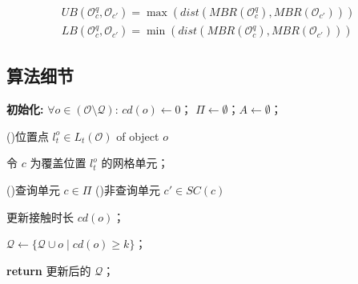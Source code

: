 \begin{equation}
    \label{contact_eq:pre-check}
        \begin{aligned}
        UB(\mathcal{O}_c^q, \mathcal{O}_{c'}) = \max (dist(\mathit{MBR}(\mathcal{O}_c^q), \mathit{MBR}(\mathcal{O}_{c'})))\\
        LB(\mathcal{O}_c^q, \mathcal{O}_{c'}) = \min (dist(\mathit{MBR}(\mathcal{O}_c^q), \mathit{MBR}(\mathcal{O}_{c'})))
        \end{aligned}
    \end{equation}



\subsection{算法细节}

\begin{algorithm}[!ht]
\caption{精确分组处理算法}
\label{contact_alg:EGP}


\textbf{初始化:}
$\forall o \in (\mathcal{O} \setminus \mathcal{Q})$: $cd(o) \leftarrow 0$；
$\Pi \leftarrow \emptyset$；$A \leftarrow \emptyset$；

\For(){位置点 $l_t^o \in L_t(\mathcal{O})$ of object $o$}{
    令 $c$ 为覆盖位置 $l_t^o$ 的网格单元；

}

\For(){查询单元 $c \in \Pi$}{
    \For(){非查询单元 $c' \in SC(c)$}{
    }
}

更新接触时长 $cd(o)$；

$\mathcal{Q} \leftarrow \{\mathcal{Q} \cup o \mid cd(o) \geq k\}$；

\textbf{return} 更新后的 $\mathcal{Q}$；
\end{algorithm}

